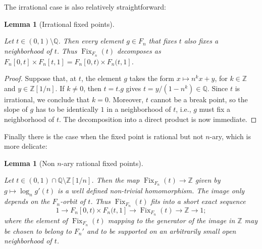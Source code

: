 \documentclass[reqno,12pt]{amsart}\setcounter{tocdepth}{1}
\newtheorem{lemma}[theorem]{Lemma}
\theoremstyle{definition}
\newcommand{\Z}{\mathbb{Z}}
\newcommand{\Q}{\mathbb{Q}}
\DeclareMathOperator{\Fix}{Fix}
\numberwithin{equation}{section}
\begin{document}
\medskip

The irrational case is also relatively straightforward:

\begin{lemma}[Irrational fixed points]
\label{lem:fix:irrational}

Let $t \in (0, 1) \setminus \Q$. Then every element $g \in F_n$ that fixes $t$ also fixes a neighborhood of $t$. Thus $\Fix_{F_n}(t)$ decomposes as $F_n[0, t] \times F_n[t, 1] = F_n[0, t) \times F_n(t, 1]$.
\end{lemma}

\begin{proof}
Suppose that, at $t$, the element $g$ takes the form $x \mapsto n^k x + y$, for $k \in \Z$ and $y \in \Z[1/n]$. If $k \neq 0$, then $t = t.g$ gives $t = y/(1-n^k) \in \Q$. Since $t$ is irrational, we conclude that $k=0$. Moreover, $t$ cannot be a break point, so the slope of $g$ has to be identically $1$ in a neighborhood of $t$, i.e., $g$ must fix a neighborhood of $t$. The decomposition into a direct product is now immediate.
\end{proof}

Finally there is the case when the fixed point is rational but not $n$-ary, which is more delicate:

\begin{lemma}[Non $n$-ary rational fixed points]
\label{lem:fix:rational}

Let $t \in (0, 1) \cap \Q \setminus \Z[1/n]$. Then the map $\Fix_{F_n}(t) \to \Z$ given by $g \mapsto \log_n g'(t)$ is a well defined non-trivial homomorphism. The image only depends on the $F_n$-orbit of $t$. Thus $\Fix_{F_n}(t)$ fits into a short exact sequence
\[1 \to F_n[0, t) \times F_n(t, 1] \to \Fix_{F_n}(t) \to \Z \to 1;\]
where the element of $\Fix_{F_n}(t)$ mapping to the generator of the image in $\Z$ may be chosen to belong to $F_n'$ and to be supported on an arbitrarily small open neighborhood of $t$.
\end{lemma}
\end{document}
